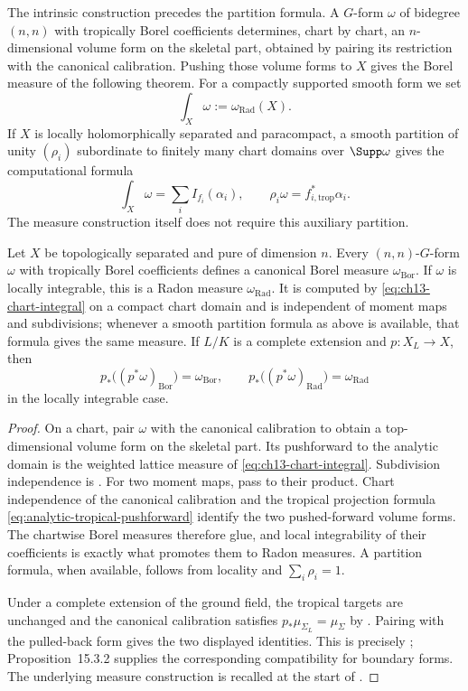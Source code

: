 The intrinsic construction precedes the partition formula.  A $G$-form
$\omega$ of bidegree $(n,n)$ with tropically Borel coefficients determines,
chart by chart, an $n$-dimensional volume form on the skeletal part, obtained
by pairing its restriction with the canonical calibration.  Pushing those
volume forms to $X$ gives the Borel measure of the following theorem.  For a
compactly supported smooth form we set
\[
                         \int_X\omega:=\omega_{\mathrm{Rad}}(X).
\]
If $X$ is locally holomorphically separated and paracompact, a smooth
partition of unity $(\rho_i)$ subordinate to finitely many chart domains over
$\Supp\omega$ gives the computational formula
\[
 \int_X\omega
 =\sum_i I_{f_i}(\alpha_i),
 \qquad
 \rho_i\omega=f_{i,\mathrm{trop}}^*\alpha_i.
\]
The measure construction itself does not require this auxiliary partition.

\begin{theorem}\label{thm:cld-analytic-integration}
Let $X$ be topologically separated and pure of dimension $n$.  Every
$(n,n)$-$G$-form $\omega$ with tropically Borel coefficients defines a
canonical Borel measure $\omega_{\mathrm{Bor}}$.  If $\omega$ is locally
integrable, this is a Radon measure $\omega_{\mathrm{Rad}}$.  It is computed
by \eqref{eq:ch13-chart-integral} on a compact chart domain and is independent
of moment maps and subdivisions; whenever a smooth partition formula as
above is available, that formula gives the same measure.  If $L/K$ is a
complete extension and $p:X_L\to X$, then
\[
 p_*\bigl((p^*\omega)_{\mathrm{Bor}}\bigr)=\omega_{\mathrm{Bor}},
 \qquad
 p_*\bigl((p^*\omega)_{\mathrm{Rad}}\bigr)=\omega_{\mathrm{Rad}}
\]
in the locally integrable case.
\end{theorem}
\begin{proof}
On a chart, pair $\omega$ with the canonical calibration to obtain a
top-dimensional volume form on the skeletal part.  Its pushforward to the
analytic domain is the weighted lattice measure of
\eqref{eq:ch13-chart-integral}.  Subdivision independence is
.  For two moment maps, pass to
their product.  Chart independence of the canonical calibration and the
tropical projection formula \eqref{eq:analytic-tropical-pushforward} identify
the two pushed-forward volume forms.  The chartwise Borel measures therefore
glue, and local integrability of their coefficients is exactly what promotes
them to Radon measures.  A partition formula, when available, follows from
locality and $\sum_i\rho_i=1$.

Under a complete extension of the ground field, the tropical targets are
unchanged and the canonical calibration satisfies
$p_*\mu_{\Sigma_L}=\mu_\Sigma$ by
.  Pairing with the pulled-back form
gives the two displayed identities.  This is precisely
\cite[Proposition~15.3.1]{CLD25}; Proposition~15.3.2 supplies the
corresponding compatibility for boundary forms.  The underlying measure
construction
is recalled at the start of \cite[\S15.3]{CLD25}.
\end{proof}


